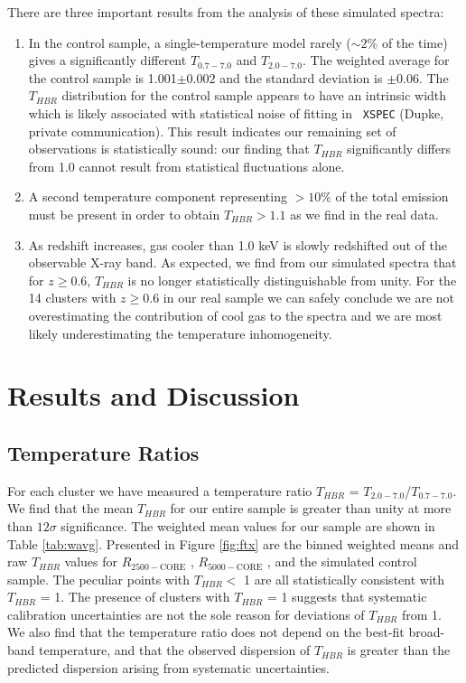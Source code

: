 \documentclass{emulateapj}
\newcommand{\rtwf}{$R_{2500-\text{CORE}}$ }
\newcommand{\rfif}{$R_{5000-\text{CORE}}$ }
\begin{document}
There are three important results from the analysis of these simulated
spectra:
\begin{enumerate}
\item In the control sample, a single-temperature model rarely
($\sim 2\%$ of the time) gives a significantly different $T_{0.7-7.0}$ and
$T_{2.0-7.0}$. The weighted average for the control sample is 1.001$\pm
0.002$ and the standard deviation is $\pm0.06$. The $T_{HBR}$
distribution for the control sample appears to have an intrinsic width
which is likely associated with statistical noise of fitting in {\tt
XSPEC} (Dupke, private communication). This result indicates our
remaining set of observations is statistically sound: our finding that
$T_{HBR}$ significantly differs from 1.0 cannot result from
statistical fluctuations alone.
\item A second temperature component representing $> 10\%$ of the total
emission must be present in order to obtain $T_{HBR} > 1.1$ as we find
in the real data.
\item As redshift increases, gas cooler than 1.0 keV is slowly
redshifted out of the observable X-ray band. As expected, we find from
our simulated spectra that for $z \geq 0.6$, $T_{HBR}$ is no longer
statistically distinguishable from unity. For the 14 clusters with $z
\geq 0.6$ in our real sample we can safely conclude we are not
overestimating the contribution of cool gas to the spectra and we are
most likely underestimating the temperature inhomogeneity.
\end{enumerate}

\section{Results and Discussion} \label{sec:r&d}

\subsection{Temperature Ratios} \label{sec:tfresults}

For each cluster we have measured a temperature ratio $T_{HBR}$ =
$T_{2.0-7.0}$/$T_{0.7-7.0}$. We find that the mean $T_{HBR}$ for our
entire sample is greater than unity at more than $12\sigma$
significance. The weighted mean values for our sample are shown in
Table \ref{tab:wavg}. Presented in Figure  \ref{fig:ftx} are the binned
weighted means and raw $T_{HBR}$ values for \rtwf, \rfif, and the
simulated control sample. The peculiar points with $T_{HBR} <$ 1 are
all statistically consistent with $T_{HBR}$ = 1. The presence of
clusters with $T_{HBR}$ = 1 suggests that systematic calibration
uncertainties are not the sole reason for deviations of $T_{HBR}$ from
1. We also find that the temperature ratio does not depend on the
best-fit broad-band temperature, and that the observed dispersion of
$T_{HBR}$ is greater than the predicted dispersion arising from
systematic uncertainties.
\end{document}
